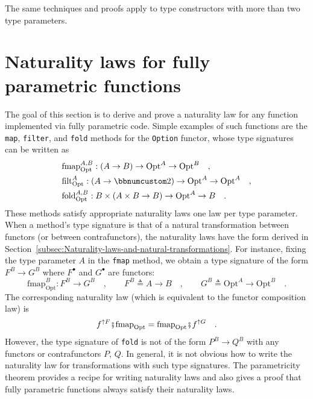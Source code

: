 The same techniques and proofs apply to type constructors with more
than two type parameters.

\section{Naturality laws for fully parametric functions\label{sec:Naturality-laws-for-fully-parametric-functions}}

The goal of this section is to derive and prove a naturality law for
any function implemented via fully parametric code. Simple examples
of such functions are the \lstinline!map!, \lstinline!filter!, and
\lstinline!fold! methods for the \lstinline!Option! functor, whose
type signatures can be written as
\begin{align*}
 & \text{fmap}_{\text{Opt}}^{A,B}:\left(A\rightarrow B\right)\rightarrow\text{Opt}^{A}\rightarrow\text{Opt}^{B}\quad,\\
 & \text{filt}_{\text{Opt}}^{A}:\left(A\rightarrow\bbnum 2\right)\rightarrow\text{Opt}^{A}\rightarrow\text{Opt}^{A}\quad,\\
 & \text{fold}_{\text{Opt}}^{A,B}:B\times\left(A\times B\rightarrow B\right)\rightarrow\text{Opt}^{A}\rightarrow B\quad.
\end{align*}
These methods satisfy appropriate naturality laws \textemdash{} one
law per type parameter. When a method\textsf{'}s type signature is that of
a natural transformation between functors (or between contrafunctors),
the naturality laws have the form derived in Section~\ref{subsec:Naturality-laws-and-natural-transformations}.
For instance, fixing the type parameter $A$ in the \lstinline!fmap!
method, we obtain a type signature of the form $F^{B}\rightarrow G^{B}$
where $F^{\bullet}$ and $G^{\bullet}$ are functors:
\[
\text{fmap}_{\text{Opt}}^{B}:F^{B}\rightarrow G^{B}\quad,\quad\quad F^{B}\triangleq A\rightarrow B\quad,\quad\quad G^{B}\triangleq\text{Opt}^{A}\rightarrow\text{Opt}^{B}\quad.
\]
The corresponding naturality law (which is equivalent to the functor
composition law) is
\[
f^{\uparrow F}\bef\text{fmap}_{\text{Opt}}=\text{fmap}_{\text{Opt}}\bef f^{\uparrow G}\quad.
\]
However, the type signature of \lstinline!fold! is not of the form
$P^{B}\rightarrow Q^{B}$ with any functors or contrafunctors $P$,
$Q$. In general, it is not obvious how to write the naturality law
for transformations with such type signatures. The parametricity theorem
provides a recipe for writing naturality laws and also gives a proof
that fully parametric functions always satisfy their naturality laws.

